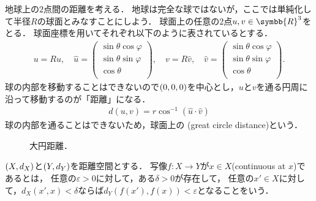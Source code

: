 \documentclass{ltjsbook}
\begin{document}
\begin{exa}
地球上の\(2\)点間の距離を考える．
地球は完全な球ではないが，ここでは単純化して半径\(R\)の球面とみなすことにしよう．
球面上の任意の\(2\)点\(u, v \in \symbb{R}^3\)をとる．
球面座標を用いてそれぞれ以下のように表されているとする．
\begin{align*}
    u = R \hat{u},
    \quad
    \hat{u} = \begin{pmatrix}
        \sin \theta \cos \varphi \\
        \sin \theta \sin \varphi \\
        \cos \theta \\
    \end{pmatrix},
    \quad
    v = R \hat{v},
    \quad
    \hat{v} = \begin{pmatrix}
        \sin \theta \cos \varphi \\
        \sin \theta \sin \varphi \\
        \cos \theta \\
    \end{pmatrix}.
\end{align*}
球の内部を移動することはできないので\((0, 0, 0)\)を中心とし，\(u\)と\(v\)を通る円周に沿って移動するのが「距離」になる．
\begin{align*}
    d(u, v) = r \cos^{-1}(\hat{u} \cdot \hat{v})
\end{align*}
球の内部を通ることはできないため，球面上の
(great circle distance)という．
\end{exa}

\begin{figure}
    \centering
    
    \caption{大円距離．}
\end{figure}

\begin{thmbox}
\begin{definition}
\((X, d_{X})\)と\((Y, d_{Y})\)を距離空間とする．
写像\(f\colon X \to Y\)が\(x \in X\)(continuous at \(x\))であるとは，
任意の\(\varepsilon > 0\)に対して，ある\(\delta > 0\)が存在して，
任意の\(x' \in X\)に対して，\(d_{X}(x', x) < \delta\)ならば\(d_{Y}(f(x'), f(x)) < \varepsilon\)となることをいう．
\end{definition}
\end{thmbox}
\end{document}
